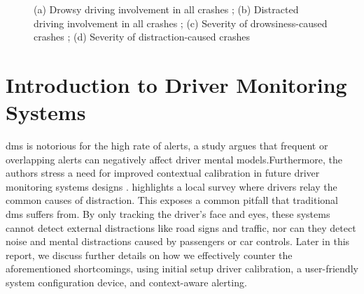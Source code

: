 \begin{figure}[htbp]
{%
}
\vspace{6pt}
\caption[\small (a) Drowsy driving involvement in all crashes; (b) Distracted driving involvement in all crashes; (c) Severity of drowsiness-caused crashes; (d) Severity of distraction-caused crashes]{\small (a) Drowsy driving involvement in all crashes \cite{r3}; (b) Distracted driving involvement in all crashes \cite{ref4}; (c) Severity of drowsiness-caused crashes \cite{r5}; (d) Severity of distraction-caused crashes \cite{r6}}
\label{fig:1.1}
\end{figure}




\section{Introduction to Driver Monitoring Systems}

\gls{dms} is notorious for the high rate of alerts, a study argues that frequent or overlapping alerts can negatively affect driver mental models.Furthermore, the authors stress a need for improved contextual calibration in future driver monitoring systems designs \cite{r12}.  highlights a local survey where drivers relay the common causes of distraction. This exposes a common pitfall that traditional \gls{dms} suffers from. By only tracking the driver's face and eyes, these systems cannot detect external distractions like road signs and traffic, nor can they detect noise and mental distractions caused by passengers or car controls. Later in this report, we discuss further details on how we effectively counter the aforementioned shortcomings, using initial setup driver calibration, a user-friendly system configuration device, and context-aware alerting.


